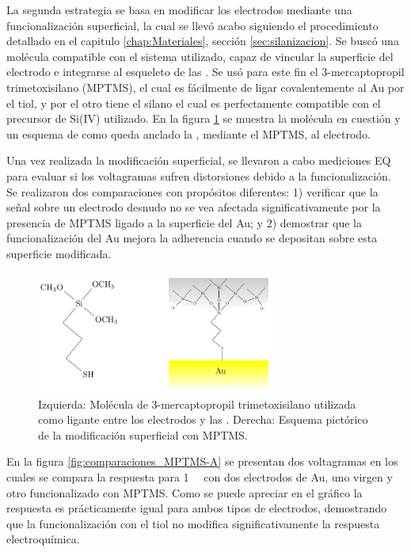 					
			 La segunda estrategia se basa en modificar los electrodos mediante una funcionalización superficial, la cual se llevó acabo siguiendo el procedimiento detallado en el capitulo \ref{chap:Materiales}, sección \ref{sec:silanizacion}. Se buscó una molécula compatible con el sistema utilizado, capaz de vincular la superficie del electrodo e integrarse al esqueleto de las \pdm. Se usó para este fin el 3-mercaptopropil trimetoxisilano (MPTMS), el cual es fácilmente de ligar covalentemente al Au por el tiol\cite{Gosser,Byun2013}, y por el otro tiene el silano el cual es perfectamente compatible con el precursor de Si(IV) utilizado\cite{Wu2014,Wu2013,Chen2011}. En la figura \ref{fig:mod_sup} se muestra la molécula en cuestión y un esquema de como queda anclado la \pdm, mediante el MPTMS, al electrodo.
		
			 Una vez realizada la modificación superficial, se llevaron a cabo mediciones EQ para evaluar si los voltagramas sufren distorsiones debido a la funcionalización. Se realizaron dos comparaciones con propósitos diferentes: 1) verificar que la señal sobre un electrodo desnudo no se vea afectada significativamente por la presencia de MPTMS ligado a la superficie del Au; y 2) demostrar que la funcionalización del Au mejora la adherencia cuando se depositan \pdm\space sobre esta superficie modificada.

			 \begin{figure}[!ht]
							\begin{center}
							\includegraphics[width=0.70\textwidth]{Esquemas/mod_sup.pdf}
							\caption[Modificación superficial de los electrodos.]{Izquierda: Molécula de  3-mercaptopropil trimetoxisilano utilizada como ligante entre los electrodos y las \pdm. Derecha: Esquema pictórico de la modificación superficial con MPTMS.}
							\label{fig:mod_sup}
							\end{center}
							\end{figure}
			 \pagebreak
							
			 En la figura \ref{fig:comparaciones_MPTMS-A} se presentan dos voltagramas en los cuales se compara la respuesta para \aminorutenio\space \SI{1}{\milli\Molar} con dos electrodos de Au, uno virgen y otro funcionalizado con MPTMS. Como se puede apreciar en el gráfico la respuesta es prácticamente igual para ambos tipos de electrodos, demostrando que la funcionalización con el tiol no modifica significativamente la respuesta electroquímica.

